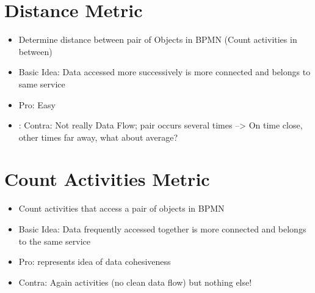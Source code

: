 \section{Distance Metric}
\begin{itemize}
	\item Determine distance between pair of Objects in BPMN (Count activities in between)
	\item Basic Idea: Data accessed more successively is more connected and belongs to same service
	\item Pro: Easy
	\item: Contra: Not really Data Flow; pair  occurs several times --> On time close, other times far away, what about average?
\end{itemize}

\section{Count Activities Metric}
\begin{itemize}
	\item Count activities that access a pair of objects in BPMN
	\item Basic Idea: Data frequently accessed together is more connected and belongs to the same service
	\item Pro: represents idea of data cohesiveness
	\item Contra: Again activities (no clean data flow) but nothing else!

\end{itemize}





